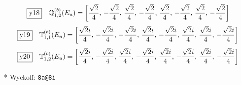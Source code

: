 \documentclass[fleqn,10pt,landscape]{jsarticle}
\begin{document}
\begin{dmath*}
\fbox{y18}\quad \mathbb{Q}_{1,2}^{(b)}(E_{u})=\left[ \frac{\sqrt{2}}{4},\, - \frac{\sqrt{2}}{4},\, \frac{\sqrt{2}}{4},\, - \frac{\sqrt{2}}{4},\, \frac{\sqrt{2}}{4},\, - \frac{\sqrt{2}}{4},\, \frac{\sqrt{2}}{4},\, - \frac{\sqrt{2}}{4} \right]
\end{dmath*}
\begin{dmath*}
\fbox{y19}\quad \mathbb{T}_{1,1}^{(b)}(E_{u})=\left[ \frac{\sqrt{2} i}{4},\, - \frac{\sqrt{2} i}{4},\, - \frac{\sqrt{2} i}{4},\, \frac{\sqrt{2} i}{4},\, - \frac{\sqrt{2} i}{4},\, \frac{\sqrt{2} i}{4},\, \frac{\sqrt{2} i}{4},\, - \frac{\sqrt{2} i}{4} \right]
\end{dmath*}
\begin{dmath*}
\fbox{y20}\quad \mathbb{T}_{1,2}^{(b)}(E_{u})=\left[ \frac{\sqrt{2} i}{4},\, - \frac{\sqrt{2} i}{4},\, \frac{\sqrt{2} i}{4},\, - \frac{\sqrt{2} i}{4},\, \frac{\sqrt{2} i}{4},\, - \frac{\sqrt{2} i}{4},\, \frac{\sqrt{2} i}{4},\, - \frac{\sqrt{2} i}{4} \right]
\end{dmath*}
\vspace{5mm}

\noindent ** Wyckoff: \texttt{8a@8i}
\end{document}
